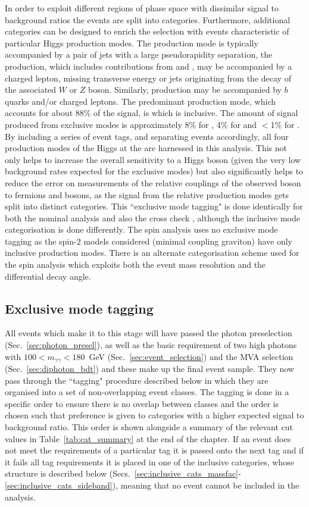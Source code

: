 In order to exploit different regions of phase space with dissimilar signal to background ratios the events are split into categories. Furthermore, additional categories can be designed to enrich the selection with events characteristic of particular Higgs production modes. The \VBF production mode is typically accompanied by a pair of jets with a large pseudorapidity separation, the \VH production, which includes contributions from \WH and \ZH, may be accompanied by a charged lepton, missing transverse energy or jets originating from the decay of the associated $W$ or $Z$ boson. Similarly, \ttH production may be accompanied by $b$ quarks and/or charged leptons. The predominant production mode, which accounts for about 88\% of the signal, is \ggH which is inclusive. The amount of signal produced from exclusive modes is approximately 8\% for \VBF, 4\% for \VH and $<$1\% for \ttH. By including a series of event tags, and separating events accordingly, all four production modes of the Higgs at the \LHC are harnessed in this analysis. This not only helps to increase the overall sensitivity to a \SM Higgs boson (given the very low background rates expected for the exclusive modes) but also significantly helps to reduce the error on measurements of the relative couplings of the observed boson to fermions and bosons, as the signal from the relative production modes gets split into distinct categories. This ``exclusive mode tagging" is done identically for both the nominal \MFM analysis and also the cross check \SMVA, although the inclusive mode categorisation is done differently. The \CiC spin analysis uses no exclusive mode tagging as the spin-2 models considered (minimal coupling graviton) have only inclusive production modes. There is an alternate categorisation scheme used for the spin analysis which exploits both the event mass resolution and the differential decay angle. 

\subsection{Exclusive mode tagging}
\label{sec:exclusive_tags}
All events which make it to this stage will have passed the photon preselection (Sec.~\ref{sec:photon_presel}), as well as the basic requirement of two high \pT photons with $100<m_{\gamma\gamma}<180$~GeV (Sec.~\ref{sec:event_selection}) and the MVA selection (Sec.~\ref{sec:diphoton_bdt}) and these make up the final event sample. They now pass through the ``tagging" procedure described below in which they are organised into a set of non-overlapping event classes. The tagging is done in a specific order to ensure there is no overlap between classes and the order is chosen such that preference is given to categories with a higher expected signal to background ratio. This order is shown alongside a summary of the relevant cut values in Table~\ref{tab:cat_summary} at the end of the chapter. If an event does not meet the requirements of a particular tag it is passed onto the next tag and if it fails all tag requirements it is placed in one of the inclusive categories, whose structure is described below (Secs.~\ref{sec:inclusive_cats_massfac}-\ref{sec:inclusive_cats_sideband}), meaning that no event cannot be included in the analysis. 

